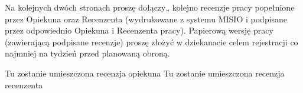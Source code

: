 \newpage

\noindent
Na kolejnych dwóch stronach proszę dołączy„ kolejno recenzje pracy popełnione przez Opiekuna oraz Recenzenta 
(wydrukowane z systemu MISIO i podpisane przez odpowiednio Opiekuna i Recenzenta pracy). 
Papierową wersję pracy (zawierającą podpisane recenzje) proszę złożyć
 w dziekanacie celem rejestracji co najmniej na tydzień przed planowaną obroną.

\newpage
Tu zostanie umieszczona recenzja opiekuna
\newpage
Tu zostanie umieszczona recenzja recenzenta
\newpage

\linespread{1.3}
\selectfont
